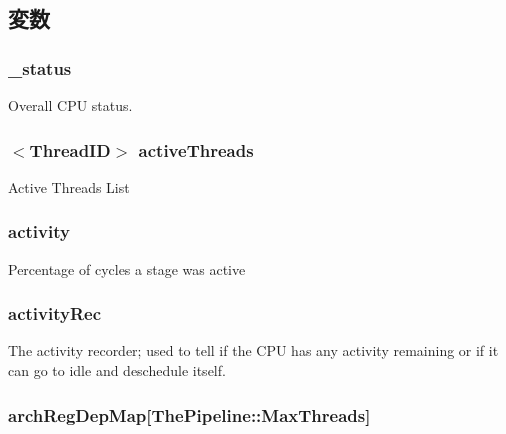 \subsection{変数}
\hypertarget{classInOrderCPU_a6cdf6e6db875a442f3ab6db542bd2bb5}{
\subsubsection[{\_\-status}]{ {\bf \_\-status}}}
\label{classInOrderCPU_a6cdf6e6db875a442f3ab6db542bd2bb5}
Overall CPU status. \hypertarget{classInOrderCPU_ae8939711cc7f6e9c795d16df91f9f258}{
\subsubsection[{activeThreads}]{$<${\bf ThreadID}$>$ {\bf activeThreads}}}
\label{classInOrderCPU_ae8939711cc7f6e9c795d16df91f9f258}
Active Threads List \hypertarget{classInOrderCPU_acaf6f85dd1ae8aa79c075d446098f5b1}{
\subsubsection[{activity}]{ {\bf activity}}}
\label{classInOrderCPU_acaf6f85dd1ae8aa79c075d446098f5b1}
Percentage of cycles a stage was active \hypertarget{classInOrderCPU_ae5ad3ebe67382e7fbc7fddcf48ae9c6c}{
\subsubsection[{activityRec}]{ {\bf activityRec}}}
\label{classInOrderCPU_ae5ad3ebe67382e7fbc7fddcf48ae9c6c}
The activity recorder; used to tell if the CPU has any activity remaining or if it can go to idle and deschedule itself. \hypertarget{classInOrderCPU_ab1f63e202ba966be3f297aa2124537a8}{
\subsubsection[{archRegDepMap}]{ {\bf archRegDepMap}\mbox{[}{\bf ThePipeline::MaxThreads}\mbox{]}}}
